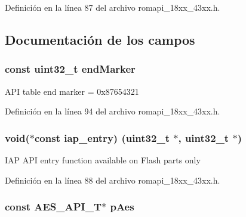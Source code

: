 Definición en la línea 87 del archivo romapi\+\_\+18xx\+\_\+43xx.\+h.



\subsection{Documentación de los campos}
\subsubsection[{\texorpdfstring{end\+Marker}{endMarker}}]{\setlength{\rightskip}{0pt plus 5cm}const uint32\+\_\+t end\+Marker}\hypertarget{struct_l_p_c___r_o_m___a_p_i___t_a7f34eaacc2cb2f0b7d2ecf6118de8571}{}\label{struct_l_p_c___r_o_m___a_p_i___t_a7f34eaacc2cb2f0b7d2ecf6118de8571}
A\+PI table end marker = 0x87654321 

Definición en la línea 94 del archivo romapi\+\_\+18xx\+\_\+43xx.\+h.

\subsubsection[{\texorpdfstring{iap\+\_\+entry}{iap_entry}}]{\setlength{\rightskip}{0pt plus 5cm}void($\ast$const iap\+\_\+entry) (uint32\+\_\+t $\ast$, uint32\+\_\+t $\ast$)}\hypertarget{struct_l_p_c___r_o_m___a_p_i___t_a219644d0e45fbef2c7223ce8a9973ed0}{}\label{struct_l_p_c___r_o_m___a_p_i___t_a219644d0e45fbef2c7223ce8a9973ed0}
I\+AP A\+PI entry function available on Flash parts only 

Definición en la línea 88 del archivo romapi\+\_\+18xx\+\_\+43xx.\+h.

\subsubsection[{\texorpdfstring{p\+Aes}{pAes}}]{\setlength{\rightskip}{0pt plus 5cm}const {\bf A\+E\+S\+\_\+\+A\+P\+I\+\_\+T}$\ast$ p\+Aes}\hypertarget{struct_l_p_c___r_o_m___a_p_i___t_adeb986ef29cf8092282c1ea911defaa0}{}\label{struct_l_p_c___r_o_m___a_p_i___t_adeb986ef29cf8092282c1ea911defaa0}


